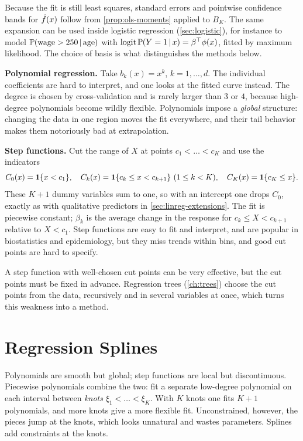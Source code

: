 Because the fit is still least squares, standard errors and pointwise confidence bands for $\hat f(x)$ follow from \cref{prop:ols-moments} applied to $B_K$. The same expansion can be used inside logistic regression (\cref{sec:logistic}), for instance to model $\mathbb{P}(\text{wage}>250\,|\,\text{age})$ with $\mathrm{logit}\,\mathbb{P}(Y=1\,|\, x)=\beta^{\top}\phi(x)$, fitted by maximum likelihood. The choice of basis is what distinguishes the methods below.

\smallskip\noindent\textbf{Polynomial regression.} Take $b_k(x)=x^k$, $k=1,\dots,d$. The individual coefficients are hard to interpret, and one looks at the fitted curve instead. The degree is chosen by cross-validation and is rarely larger than $3$ or $4$, because high-degree polynomials become wildly flexible. Polynomials impose a \emph{global} structure: changing the data in one region moves the fit everywhere, and their tail behavior makes them notoriously bad at extrapolation.

\smallskip\noindent\textbf{Step functions.} Cut the range of $X$ at points $c_1<\dots<c_K$ and use the indicators
\[
C_0(x)=\mathbf{1}\{x<c_1\},\quad C_k(x)=\mathbf{1}\{c_k\le x<c_{k+1}\}\ (1\le k<K),\quad C_K(x)=\mathbf{1}\{c_K\le x\}.
\]
These $K+1$ dummy variables sum to one, so with an intercept one drops $C_0$, exactly as with qualitative predictors in \cref{sec:linreg-extensions}. The fit is piecewise constant; $\beta_k$ is the average change in the response for $c_k\le X<c_{k+1}$ relative to $X<c_1$. Step functions are easy to fit and interpret, and are popular in biostatistics and epidemiology, but they miss trends within bins, and good cut points are hard to specify.

\begin{remark}
A step function with well-chosen cut points can be very effective, but the cut points must be fixed in advance. Regression trees (\cref{ch:trees}) choose the cut points from the data, recursively and in several variables at once, which turns this weakness into a method.
\end{remark}

\section{Regression Splines}\label{sec:splines}

Polynomials are smooth but global; step functions are local but discontinuous. Piecewise polynomials combine the two: fit a separate low-degree polynomial on each interval between \emph{knots} $\xi_1<\dots<\xi_K$. With $K$ knots one fits $K+1$ polynomials, and more knots give a more flexible fit. Unconstrained, however, the pieces jump at the knots, which looks unnatural and wastes parameters. Splines add constraints at the knots.

